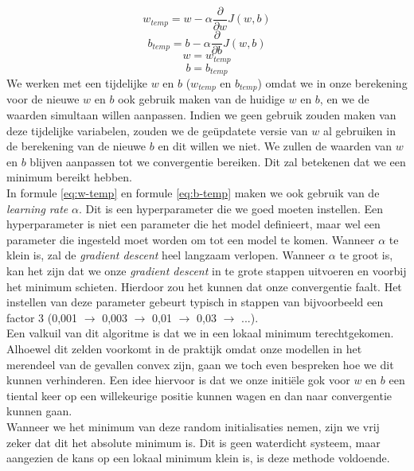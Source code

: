 \begin{equation}
	w_{temp} = w - \alpha \frac{\partial}{\partial w} J(w, b)
	\label{eq:w-temp}
\end{equation}
\begin{equation}
	b_{temp} = b - \alpha \frac{\partial}{\partial b} J(w, b)
	\label{eq:b-temp}
\end{equation}
\begin{equation}
	w = w_{temp} 
\end{equation}
\begin{equation}
	b = b_{temp}
\end{equation}
\noindent
We werken met een tijdelijke $w$ en $b$ ($w_{temp}$ en $b_{temp}$) omdat we in onze berekening voor de nieuwe $w$ en $b$ ook gebruik maken van de huidige $w$ en $b$, en we de waarden simultaan willen aanpassen. Indien we geen gebruik zouden maken van deze tijdelijke variabelen, zouden we de geüpdatete versie van $w$ al gebruiken in de berekening van de nieuwe $b$ en dit willen we niet. We zullen de waarden van $w$ en $b$ blijven aanpassen tot we convergentie bereiken. Dit zal betekenen dat we een minimum bereikt hebben. \\
\newline
In formule \ref{eq:w-temp} en formule \ref{eq:b-temp} maken we ook gebruik van de \textit{learning rate} $\alpha$. Dit is een hyperparameter die we goed moeten instellen. Een hyperparameter is niet een parameter die het model definieert, maar wel een parameter die ingesteld moet worden om tot een model te komen. Wanneer $\alpha$ te klein is, zal de \textit{gradient descent} heel langzaam verlopen. Wanneer $\alpha$ te groot is, kan het zijn dat we onze \textit{gradient descent} in te grote stappen uitvoeren en voorbij het minimum schieten. Hierdoor zou het kunnen dat onze convergentie faalt. Het instellen van deze parameter gebeurt typisch in stappen van bijvoorbeeld een factor 3 (0,001 $\rightarrow$ 0,003 $\rightarrow$ 0,01 $\rightarrow$ 0,03 $\rightarrow$ ...). \\
\newline
Een valkuil van dit algoritme is dat we in een lokaal minimum terechtgekomen. Alhoewel dit zelden voorkomt in de praktijk omdat onze modellen in het merendeel van de gevallen convex zijn, gaan we toch even bespreken hoe we dit kunnen verhinderen. Een idee hiervoor is dat we onze initiële gok voor $w$ en $b$ een tiental keer op een willekeurige positie kunnen wagen en dan naar convergentie kunnen gaan. \\
\newline
Wanneer we het minimum van deze random initialisaties nemen, zijn we vrij zeker dat dit het absolute minimum is. Dit is geen waterdicht systeem, maar aangezien de kans op een lokaal minimum klein is, is deze methode voldoende.

